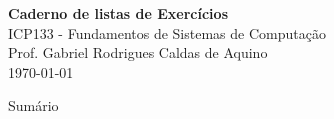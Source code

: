 \documentclass[a4paper,12pt]{article}
\begin{document}
\begin{titlepage}
    \centering
    \vspace*{5cm}
    {\Huge \textbf{Caderno de listas de Exercícios}}\\[1cm]

    {\Large ICP133 -  Fundamentos de Sistemas de Computação}\\[0.5cm]
    {\large Prof. Gabriel Rodrigues Caldas de Aquino}\\[0.5cm]
    {\large \today}\\

\end{titlepage}

Sumário
\tableofcontents
\clearpage





%
\end{document}
